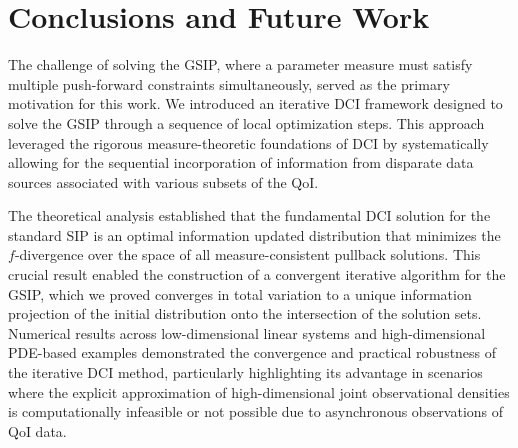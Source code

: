 \documentclass{article}
\newcounter{example}[section]
\begin{document}



\section{Conclusions and Future Work}\label{sec:conclusions}

The challenge of solving the GSIP, where a parameter measure must satisfy multiple push-forward constraints simultaneously, served as the primary motivation for this work. 
We introduced an iterative DCI framework designed to solve the GSIP through a sequence of local optimization steps. 
This approach leveraged the rigorous measure-theoretic foundations of DCI by systematically allowing for the sequential incorporation of information from disparate data sources associated with various subsets of the QoI.

The theoretical analysis established that the fundamental DCI solution for the standard SIP is an optimal information updated distribution that minimizes the $f$-divergence over the space of all measure-consistent pullback solutions. 
This crucial result enabled the construction of a convergent iterative algorithm for the GSIP, which we proved converges in total variation to a unique information projection of the initial distribution onto the intersection of the solution sets. 
Numerical results across low-dimensional linear systems and high-dimensional PDE-based examples demonstrated the convergence and practical robustness of the iterative DCI method, particularly highlighting its advantage in scenarios where the explicit approximation of high-dimensional joint observational densities is computationally infeasible or not possible due to asynchronous observations of QoI data.
\end{document}
